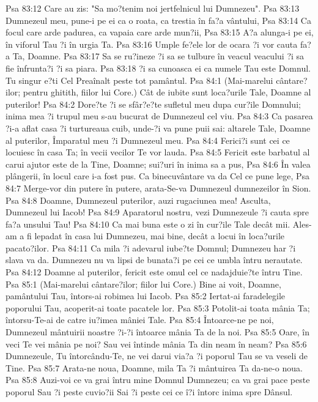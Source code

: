Psa 83:12  Care au zis: "Sa mo?tenim noi jertfelnicul lui Dumnezeu".
Psa 83:13  Dumnezeul meu, pune-i pe ei ca o roata, ca trestia în fa?a vântului,
Psa 83:14  Ca focul care arde padurea, ca vapaia care arde mun?ii,
Psa 83:15  A?a alunga-i pe ei, în viforul Tau ?i în urgia Ta.
Psa 83:16  Umple fe?ele lor de ocara ?i vor cauta fa?a Ta, Doamne.
Psa 83:17  Sa se ru?ineze ?i sa se tulbure în veacul veacului ?i sa fie înfrunta?i ?i sa piara.
Psa 83:18  ?i sa cunoasca ei ca numele Tau este Domnul. Tu singur e?ti Cel Preaînalt peste tot pamântul.
Psa 84:1  (Mai-marelui cântare?ilor; pentru ghitith, fiilor lui Core.) Cât de iubite sunt loca?urile Tale, Doamne al puterilor!
Psa 84:2  Dore?te ?i se sfâr?e?te sufletul meu dupa cur?ile Domnului; inima mea ?i trupul meu s-au bucurat de Dumnezeul cel viu.
Psa 84:3  Ca pasarea ?i-a aflat casa ?i turtureaua cuib, unde-?i va pune puii sai: altarele Tale, Doamne al puterilor, Împaratul meu ?i Dumnezeul meu.
Psa 84:4  Ferici?i sunt cei ce locuiesc în casa Ta; în vecii vecilor Te vor lauda.
Psa 84:5  Fericit este barbatul al carui ajutor este de la Tine, Doamne; sui?uri în inima sa a pus,
Psa 84:6  În valea plângerii, în locul care i-a fost pus. Ca binecuvântare va da Cel ce pune lege,
Psa 84:7  Merge-vor din putere în putere, arata-Se-va Dumnezeul dumnezeilor în Sion.
Psa 84:8  Doamne, Dumnezeul puterilor, auzi rugaciunea mea! Asculta, Dumnezeul lui Iacob!
Psa 84:9  Aparatorul nostru, vezi Dumnezeule ?i cauta spre fa?a unsului Tau!
Psa 84:10  Ca mai buna este o zi în cur?ile Tale decât mii. Ales-am a fi lepadat în casa lui Dumnezeu, mai bine, decât a locui în loca?urile pacato?ilor.
Psa 84:11  Ca mila ?i adevarul iube?te Domnul; Dumnezeu har ?i slava va da. Dumnezeu nu va lipsi de bunata?i pe cei ce umbla întru nerautate.
Psa 84:12  Doamne al puterilor, fericit este omul cel ce nadajduie?te întru Tine.
Psa 85:1  (Mai-marelui cântare?ilor; fiilor lui Core.) Bine ai voit, Doamne, pamântului Tau, întors-ai robimea lui Iacob.
Psa 85:2  Iertat-ai faradelegile poporului Tau, acoperit-ai toate pacatele lor.
Psa 85:3  Potolit-ai toata mânia Ta; întorsu-Te-ai de catre iu?imea mâniei Tale.
Psa 85:4  Întoarce-ne pe noi, Dumnezeul mântuirii noastre ?i-?i întoarce mânia Ta de la noi.
Psa 85:5  Oare, în veci Te vei mânia pe noi? Sau vei întinde mânia Ta din neam în neam?
Psa 85:6  Dumnezeule, Tu întorcându-Te, ne vei darui via?a ?i poporul Tau se va veseli de Tine.
Psa 85:7  Arata-ne noua, Doamne, mila Ta ?i mântuirea Ta da-ne-o noua.
Psa 85:8  Auzi-voi ce va grai întru mine Domnul Dumnezeu; ca va grai pace peste poporul Sau ?i peste cuvio?ii Sai ?i peste cei ce î?i întorc inima spre Dânsul.
